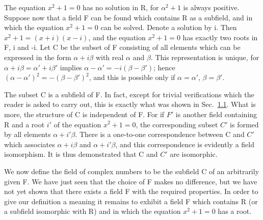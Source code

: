The equation $x^{2} + 1 = 0$ has no solution in R, for $\alpha^{2} + 1$ is always positive. Suppose now that a field F can be found which contains R as a subfield, and in which the equation $x^{2} + 1 = 0$ can be solved. Denote a solution by i. Then $x^{2} + 1 = (x + i)(x - i)$, and the equation $x^{2} + 1 = 0$ has exactly two roots in F, i and -i. Let C be the subset of F consisting of all elements which can be expressed in the form $\alpha + i\beta$ with real $\alpha$ and $\beta$. This representation is unique, for $\alpha + i\beta = \alpha' + i\beta'$ implies $\alpha - \alpha' = -i(\beta - \beta')$; hence $(\alpha - \alpha')^{2} = -(\beta - \beta')^{2}$, and this is possible only if $\alpha = \alpha'$, $\beta = \beta'$.

The subset C is a subfield of F. In fact, except for trivial verifications which the reader is asked to carry out, this is exactly what was shown in Sec.~\hyperref[sec:1.1.1]{1.1}. What is more, the structure of C is independent of F. For if $F'$ is another field containing R and a root $i'$ of the equation $x^{2} + 1 = 0$,
\begingroup\renewcommand{\thefootnote}{}\endgroup
the corresponding subset $C'$ is formed by all elements $\alpha + i'\beta$. There is a one-to-one correspondence between C and $C'$ which associates $\alpha + i\beta$ and $\alpha + i'\beta$, and this correspondence is evidently a field isomorphism. It is thus demonstrated that C and $C'$ are isomorphic.

We now define the field of complex numbers to be the subfield C of an arbitrarily given F. We have just seen that the choice of F makes no difference, but we have not yet shown that there exists a field F with the required properties. In order to give our definition a meaning it remains to exhibit a field F which contains R (or a subfield isomorphic with R) and in which the equation $x^{2} + 1 = 0$ has a root.

